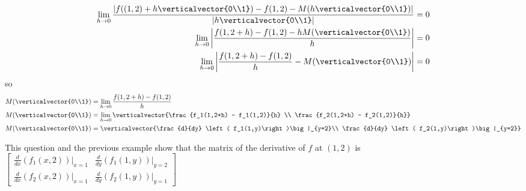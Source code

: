 \documentclass{ximera}
\begin{document}
\begin{free-response}

 \begin{align*}
 	  \displaystyle\lim_{h \to 0} \frac{\left|f((1,2)+h\verticalvector{0\\1}) - f(1,2) - M(h\verticalvector{0\\1})\right|}{\left|h \verticalvector{0\\1}\right|} &= 0\\
	  \displaystyle\lim_{h \to 0}\left| \frac{f(1,2+h) - f(1,2) - hM(\verticalvector{0\\1})}{h} \right| &= 0\\
	  \displaystyle\lim_{h \to 0}\left| \frac{f(1,2+h) - f(1,2)}{h} -M(\verticalvector{0\\1})\right| &= 0
	  \end{align*}
	  so
	  \begin{align*}
	  M(\verticalvector{0\\1}) &= \displaystyle\lim_{ h \to 0 } \frac{f(1,2+h) - f(1,2)}{h}\\
	  M(\verticalvector{0\\1}) &= \displaystyle\lim_{ h \to 0 } \verticalvector{\frac{f_1(1,2+h) - f_1(1,2)}{h} \\ \frac{f_2(1,2+h) - f_2(1,2)}{h}}\\
	  M(\verticalvector{0\\1}) &= \verticalvector{\frac{d}{dy} \left( f_1(1,y)\right)\big|_{y=2}\\ \frac{d}{dy} \left( f_2(1,y)\right)\big|_{y=2}}
	 \end{align*}
\end{free-response}

This question and the previous example show that the matrix of the derivative of $f$ at $(1,2)$ is 
\(
\begin{bmatrix} \frac{d}{dx}(f_1(x,2))\big|_{x=1} & \frac{d}{dy}(f_1(1,y))\big|_{y=2}
\\ 
\frac{d}{dx}(f_2(x,2))\big|_{x=1} & \frac{d}{dy}(f_2(1,y))\big|_{y=1}\end{bmatrix}
\)
\end{document}

